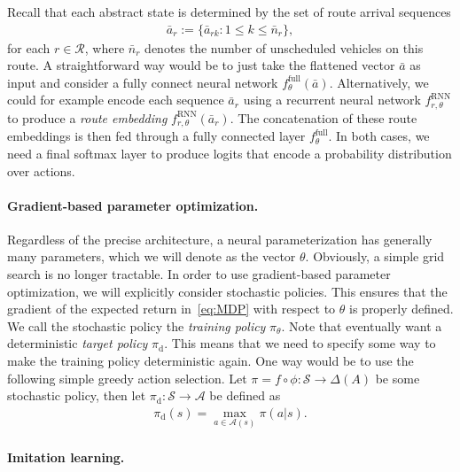 \documentclass{report}
\theoremstyle{definition}
\theoremstyle{plain}
\begin{document}
Recall that each abstract state is determined by the set of route arrival
sequences
\begin{align}
  \bar{a}_r := \{ \bar{a}_{rk} : 1 \leq k \leq \bar{n}_r \} ,
\end{align}
for each $r \in \mathcal{R}$, where $\bar{n}_r$ denotes the number of
unscheduled vehicles on this route.
%
A straightforward way would be to just take the flattened vector $\bar{a}$ as
input and consider a fully connect neural network
$f^{\mathrm{full}}_\theta(\bar{a})$.
%
Alternatively, we could for example encode each sequence $\bar{a}_r$ using a
recurrent neural network $f^{\mathrm{RNN}}_{r,\theta}$ to produce a \emph{route
  embedding} $f^{\mathrm{RNN}}_{r,\theta}(\bar{a}_r)$.
%
The concatenation of these route embeddings is then fed through a fully connected
layer $f^{\mathrm{full}}_\theta$.
%
In both cases, we need a final softmax layer to produce logits that encode a
probability distribution over actions.


\paragraph{Gradient-based parameter optimization.}
Regardless of the precise architecture, a neural parameterization has generally
many parameters, which we will denote as the vector $\theta$. Obviously, a
simple grid search is no longer tractable.
%
In order to use gradient-based parameter optimization, we will explicitly
consider stochastic policies. This ensures that the gradient of the expected
return in~\eqref{eq:MDP} with respect to $\theta$ is properly defined.
%
We call the stochastic policy the \emph{training policy} $\pi_\theta$.
%
Note that eventually want a deterministic \emph{target policy} $\pi_\mathrm{d}$.
This means that we need to specify some way to make the training policy deterministic again.
One way would be to use the following simple greedy action selection.
%
Let $\pi = f \circ \phi : \mathcal{S} \rightarrow \Delta(A)$ be some stochastic
policy, then let $\pi_\mathrm{d} : \mathcal{S} \rightarrow \mathcal{A}$ be
defined as
\begin{align} 
  \pi_\mathrm{d}(s) = \max_{a \in \mathcal{A}(s)} \pi(a | s).
\end{align}


\paragraph{Imitation learning.}
\end{document}
